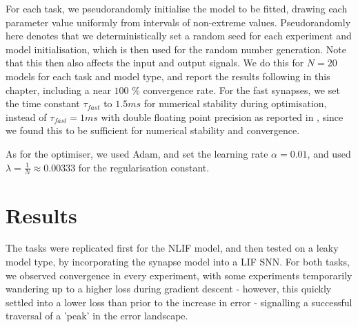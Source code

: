 \documentclass[mphil,deptreport,ianc]{infthesis} %
\begin{document}
For each task, we pseudorandomly initialise the model to be fitted, drawing each parameter value uniformly from intervals of non-extreme values.
Pseudorandomly here denotes that we deterministically set a random seed for each experiment and model initialisation, which is then used for the random number generation.
Note that this then also affects the input and output signals.
We do this for $N=20$ models for each task and model type, and report the results following in this chapter, including a near $100$ \% convergence rate.
For the fast synapses, we set the time constant $\tau_{fast}$ to $1.5 \si{ms}$ for numerical stability during optimisation, instead of $\tau_{fast}=1 \si{ms}$ with double floating point precision as reported in \cite{Huh2017}, since we found this to be sufficient for numerical stability and convergence. 

As for the optimiser, we used Adam, and set the learning rate $\alpha=0.01$, and used $\lambda = \frac{1}{N} \approx 0.00333$ for the regularisation constant.


\section{Results}

The tasks were replicated first for the NLIF model, and then tested on a leaky model type, by incorporating the synapse model into a LIF SNN.
For both tasks, we observed convergence in every experiment, with some experiments temporarily wandering up to a higher loss during gradient descent - however, this quickly settled into a lower loss than prior to the increase in error - signalling a successful traversal of a 'peak' in the error landscape.
\end{document}
